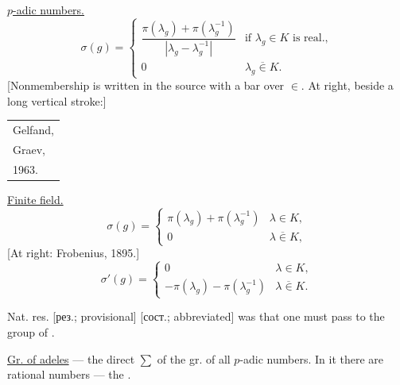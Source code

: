 \par\noindent\begin{minipage}{\linewidth}
\underline{$p$-adic numbers.}
\begin{equation*}
\sigma(g)=\begin{cases}
\dfrac{\pi(\lambda_g)+\pi(\lambda_g^{-1})}{|\lambda_g-\lambda_g^{-1}|}&\text{if }\lambda_g\in K\text{ is real.},\\
0&\lambda_g{\overline{\in}}K.
\end{cases}
\end{equation*}
[Nonmembership is written in the source with a bar over $\in$. At right, beside a long vertical stroke:]
\begin{tabular}{|l}Gelfand,\\Graev,\\1963.\end{tabular}
\end{minipage}\par\medskip
\underline{Finite field.}
\begin{equation*}
\sigma(g)=\begin{cases}
\pi(\lambda_g)+\pi(\lambda_g^{-1})&\lambda\in K,\\
0&\lambda{\overline{\in}}K,
\end{cases}
\end{equation*}
[At right: Frobenius, 1895.]
\begin{equation*}
\sigma'(g)=\begin{cases}
0&\lambda\in K,\\
-\pi(\lambda_g)-\pi(\lambda_g^{-1})&\lambda{\overline{\in}}K.
\end{cases}
\end{equation*}

\par\noindent\begin{minipage}{\linewidth}
\textcolor{orange!65!black}{Nat. res. [рез.; provisional] [сост.; abbreviated]} was that one must pass to the group of .
\end{minipage}\par
\underline{Gr. of adeles} --- the direct $\sum$ of the gr. of all $p$-adic numbers.
In it there are rational numbers --- the .

